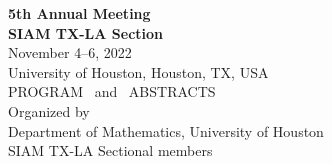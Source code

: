 \thispagestyle{empty}
\vspace*{4ex}

{\center
{\LARGE \bf 5th Annual Meeting}\\  [8mm]
{\Huge \bf SIAM TX-LA Section} \\ [8mm]

{\Large November 4--6, 2022} \\[3mm]
{\Large University of Houston, Houston, TX, USA} \\[36mm]

{\LARGE PROGRAM \ and \ ABSTRACTS}  \\ [32mm]


{\large Organized by} \\ [3mm]
{\Large Department of  Mathematics, University of Houston\\
\vspace{5pt} SIAM TX-LA Sectional members} \\ [16mm]


}
